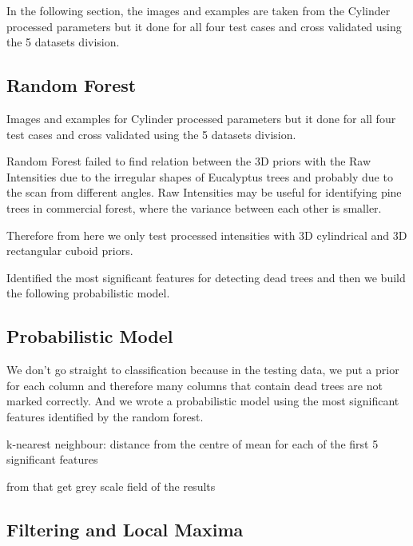 \documentclass{subfiles}
\begin{document}
	\par In the following section, the images and examples are taken from the Cylinder processed parameters but it done for all four test cases and cross validated using the 5 datasets division.




\subsection{Random Forest}
	\par Images and examples for Cylinder processed parameters but it done for all four test cases and cross validated using the 5 datasets division.
	
	
	\par Random Forest failed to find relation between the 3D priors with the Raw Intensities due to the irregular shapes of Eucalyptus trees and probably due to the scan from different angles. Raw Intensities may be useful for identifying pine trees in commercial forest, where the variance between each other is smaller. 

	
	\par Therefore from here we only test processed intensities with 3D cylindrical and 3D  rectangular cuboid priors. 
	
	\par Identified the most significant features for detecting dead trees and then we build the following probabilistic model. 
	
\subsection{Probabilistic Model}

\par We don't go straight to classification because in the testing data, we put a prior for each column and therefore many columns that contain dead trees are not marked correctly. And we wrote a probabilistic model using the most significant features identified by the random forest. 

 \par k-nearest neighbour: distance from the centre of mean for each of the first 5 significant features 
 
 
 \par from that get grey scale field of the results 
 
 
 
 \subsection{Filtering and Local Maxima}
 
\end{document}
